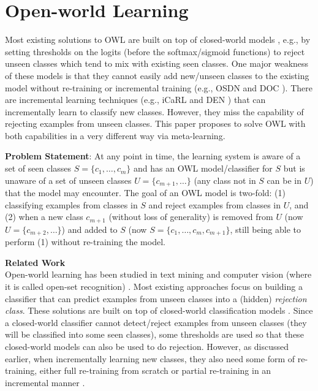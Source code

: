 \section{Open-world Learning}
Most existing solutions to OWL are built on top of closed-world models \cite{bendale2015towards,bendale2016towards,fei2016learning,shu-xu-liu:2017:EMNLP2017}, e.g., by setting thresholds on the logits (before the softmax/sigmoid functions) to reject unseen classes which tend to mix with existing seen classes. One major weakness of these models is that they cannot easily add new/unseen classes to the existing model without re-training or incremental training (e.g., OSDN \cite{bendale2016towards} and DOC \cite{shu-xu-liu:2017:EMNLP2017}).
There are incremental learning techniques (e.g., iCaRL \cite{rebuffi2017icarl} and DEN \cite{lee2017lifelong}) that can incrementally learn to classify new classes. However, they miss the capability of rejecting examples from unseen classes.
This paper proposes to solve OWL with both capabilities in a very different way via meta-learning.

\textbf{Problem Statement}: At any point in time, the learning system is aware of a set of seen classes $S=\{c_1, \dots, c_m\}$
and has an OWL model/classifier for $S$ but is unaware of a set of unseen classes $U=\{c_{m+1}, \dots\}$ (any class not in $S$ can be in $U$) that the model may encounter. The goal of an OWL model is two-fold: (1) classifying examples from classes in $S$ and reject examples from classes in $U$, and (2) when a new class $c_{m+1}$ (without loss of generality) is removed from $U$ (now $U=\{c_{m+2}, \dots\}$) and added to $S$ (now $S=\{c_1, \dots, c_m, c_{m+1}\}$, still being able to perform (1) without re-training the model.

\textbf{Related Work}\\
\label{chap2:sec:rel}
Open-world learning has been studied in text mining and computer vision (where it is called open-set recognition) \cite{bendale2015towards,chen2018lifelong,fei2016learning}. Most existing approaches focus on building a classifier that can predict examples from unseen classes into a (hidden) \textit{rejection class}.
These solutions are built on top of closed-world classification models \cite{bendale2015towards,bendale2016towards,shu-xu-liu:2017:EMNLP2017}. Since a closed-world classifier cannot detect/reject examples from unseen classes (they will be classified into some seen classes), some thresholds are used so that these closed-world models can also be used to do rejection. However, as discussed earlier, when incrementally learning new classes, they also need some form of re-training, either full re-training from scratch \cite{bendale2016towards,shu-xu-liu:2017:EMNLP2017} or partial re-training in an incremental manner \cite{bendale2015towards,fei2016learning}. 

